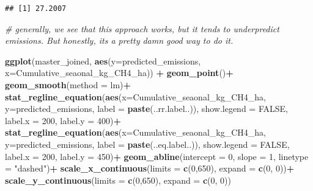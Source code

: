 \documentclass[
]{article}
\newenvironment{Shaded}{\begin{snugshade}}{\end{snugshade}}
\newcommand{\AttributeTok}[1]{\textcolor[rgb]{0.13,0.29,0.53}{#1}}
\newcommand{\CommentTok}[1]{\textcolor[rgb]{0.56,0.35,0.01}{\textit{#1}}}
\newcommand{\ConstantTok}[1]{\textcolor[rgb]{0.56,0.35,0.01}{#1}}
\newcommand{\DecValTok}[1]{\textcolor[rgb]{0.00,0.00,0.81}{#1}}
\newcommand{\FunctionTok}[1]{\textcolor[rgb]{0.13,0.29,0.53}{\textbf{#1}}}
\newcommand{\NormalTok}[1]{#1}
\newcommand{\SpecialCharTok}[1]{\textcolor[rgb]{0.81,0.36,0.00}{\textbf{#1}}}
\newcommand{\StringTok}[1]{\textcolor[rgb]{0.31,0.60,0.02}{#1}}
\begin{document}
\begin{verbatim}
## [1] 27.2007
\end{verbatim}

\begin{Shaded}
\begin{Highlighting}[]
\CommentTok{\# generally, we see that this approach works, but it tends to underpredict emissions. But honestly, its a pretty damn good way to do it. }

\FunctionTok{ggplot}\NormalTok{(master\_joined, }\FunctionTok{aes}\NormalTok{(}\AttributeTok{y=}\NormalTok{predicted\_emissions, }\AttributeTok{x=}\NormalTok{Cumulative\_seaonal\_kg\_CH4\_ha)) }\SpecialCharTok{+} \FunctionTok{geom\_point}\NormalTok{()}\SpecialCharTok{+}
\FunctionTok{geom\_smooth}\NormalTok{(}\AttributeTok{method =}\NormalTok{ lm)}\SpecialCharTok{+}
  \FunctionTok{stat\_regline\_equation}\NormalTok{(}\FunctionTok{aes}\NormalTok{(}\AttributeTok{x=}\NormalTok{Cumulative\_seaonal\_kg\_CH4\_ha, }\AttributeTok{y=}\NormalTok{predicted\_emissions, }
    \AttributeTok{label =}  \FunctionTok{paste}\NormalTok{(..rr.label..)),}
    \AttributeTok{show.legend =} \ConstantTok{FALSE}\NormalTok{, }
    \AttributeTok{label.x =} \DecValTok{200}\NormalTok{,}
    \AttributeTok{label.y =} \DecValTok{400}\NormalTok{)}\SpecialCharTok{+}
  \FunctionTok{stat\_regline\_equation}\NormalTok{(}\FunctionTok{aes}\NormalTok{(}\AttributeTok{x=}\NormalTok{Cumulative\_seaonal\_kg\_CH4\_ha, }\AttributeTok{y=}\NormalTok{predicted\_emissions, }
    \AttributeTok{label =} \FunctionTok{paste}\NormalTok{(..eq.label..)),}
    \AttributeTok{show.legend =} \ConstantTok{FALSE}\NormalTok{, }
    \AttributeTok{label.x =} \DecValTok{200}\NormalTok{, }
    \AttributeTok{label.y =} \DecValTok{450}\NormalTok{)}\SpecialCharTok{+}
    \FunctionTok{geom\_abline}\NormalTok{(}\AttributeTok{intercept =} \DecValTok{0}\NormalTok{, }\AttributeTok{slope =} \DecValTok{1}\NormalTok{, }\AttributeTok{linetype =} \StringTok{"dashed"}\NormalTok{)}\SpecialCharTok{+}
  \FunctionTok{scale\_x\_continuous}\NormalTok{(}\AttributeTok{limits =} \FunctionTok{c}\NormalTok{(}\DecValTok{0}\NormalTok{,}\DecValTok{650}\NormalTok{), }\AttributeTok{expand =} \FunctionTok{c}\NormalTok{(}\DecValTok{0}\NormalTok{, }\DecValTok{0}\NormalTok{))}\SpecialCharTok{+}
  \FunctionTok{scale\_y\_continuous}\NormalTok{(}\AttributeTok{limits =} \FunctionTok{c}\NormalTok{(}\DecValTok{0}\NormalTok{,}\DecValTok{650}\NormalTok{), }\AttributeTok{expand =} \FunctionTok{c}\NormalTok{(}\DecValTok{0}\NormalTok{, }\DecValTok{0}\NormalTok{))}
\end{Highlighting}
\end{Shaded}
\end{document}
